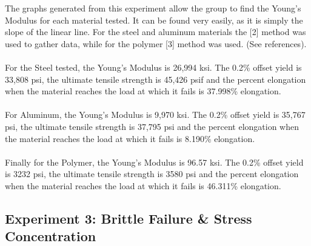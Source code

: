 \documentclass{article}
\begin{document}
The graphs generated from this experiment allow the group to find the Young’s Modulus for each material tested. It can be found very easily, as it is simply the slope of the linear line. For the steel and aluminum materials the [2] method was used to gather data, while for the polymer [3] method was used. (See references). 
\paragraph{}
For the Steel tested, the Young’s Modulus is 26,994 ksi. The 0.2\% offset yield is 33,808 psi, the ultimate tensile strength is 45,426 psif and the percent elongation when the material reaches the load at which it fails is 37.998\% elongation. 
\paragraph{}
For Aluminum, the Young’s Modulus is 9,970 ksi. The 0.2\% offset yield is 35,767 psi, the ultimate tensile strength is 37,795 psi and the percent elongation when the material reaches the load at which it fails is 8.190\% elongation. 
\paragraph{}
Finally for the Polymer, the Young’s Modulus is 96.57 ksi. The 0.2\% offset yield is 3232 psi, the ultimate tensile strength is 3580 psi and the percent elongation when the material reaches the load at which it fails is 46.311\% elongation.

\subsection{Experiment 3: Brittle Failure \& Stress Concentration}
\end{document}
